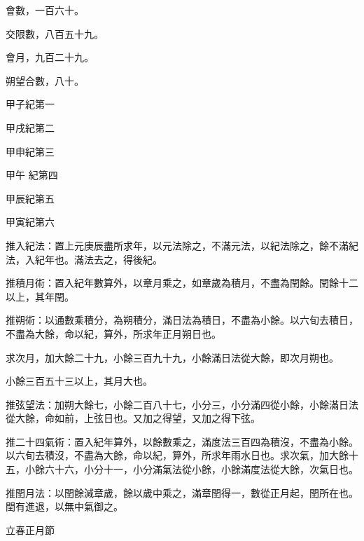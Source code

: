 \begin{pinyinscope}
 會數，一百六十。



 交限數，八百五十九。



 會月，九百二十九。



 朔望合數，八十。


甲子紀第一


甲戌紀第二


甲申紀第三


甲午
 紀第四


甲辰紀第五


甲寅紀第六


推入紀法：置上元庚辰盡所求年，以元法除之，不滿元法，以紀法除之，餘不滿紀法，入紀年也。滿法去之，得後紀。



 推積月術：置入紀年數算外，以章月乘之，如章歲為積月，不盡為閏餘。閏餘十二以上，其年閏。



 推朔術：以通數乘積分，為朔積分，滿日法為積日，不盡為小餘。以六旬去積日，不盡為大餘，命以紀，算外，所求年正月朔日也。



 求次月，加大餘二十九，小餘三百九十九，小餘滿日法從大餘，即次月朔也。



 小餘三百五十三以上，其月大也。



 推弦望法：加朔大餘七，小餘二百八十七，小分三，小分滿四從小餘，小餘滿日法從大餘，命如前，上弦日也。又加之得望，又加之得下弦。


推二十四氣術：置入紀年算外，以餘數乘之，滿度法三百四為積沒，不盡為小餘。以六旬去積沒，不盡為大餘，命以紀，算外，所求年雨水日也。求次氣，加大餘十五，小餘六十六，小分十一，小分滿氣法從小餘，小餘滿度法從大餘，次氣日也。



 推閏月法：以閏餘減章歲，餘以歲中乘之，滿章閏得一，數從正月起，閏所在也。閏有進退，以無中氣御之。


立春正月節



\end{pinyinscope}
